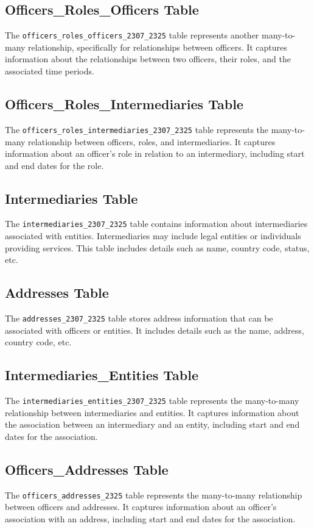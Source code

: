 \documentclass{article}
\begin{document}
\subsection*{Officers\_Roles\_Officers Table}
The \texttt{officers\_roles\_officers\_2307\_2325} table represents another many-to-many relationship, specifically for relationships between officers. It captures information about the relationships between two officers, their roles, and the associated time periods.

\subsection*{Officers\_Roles\_Intermediaries Table}
The \texttt{officers\_roles\_intermediaries\_2307\_2325} table represents the many-to-many relationship between officers, roles, and intermediaries. It captures information about an officer's role in relation to an intermediary, including start and end dates for the role.

\subsection*{Intermediaries Table}
The \texttt{intermediaries\_2307\_2325} table contains information about intermediaries associated with entities. Intermediaries may include legal entities or individuals providing services. This table includes details such as name, country code, status, etc.

\subsection*{Addresses Table}
The \texttt{addresses\_2307\_2325} table stores address information that can be associated with officers or entities. It includes details such as the name, address, country code, etc.

\subsection*{Intermediaries\_Entities Table}
The \texttt{intermediaries\_entities\_2307\_2325} table represents the many-to-many relationship between intermediaries and entities. It captures information about the association between an intermediary and an entity, including start and end dates for the association.

\subsection*{Officers\_Addresses Table}
The \texttt{officers\_addresses\_2325} table represents the many-to-many relationship between officers and addresses. It captures information about an officer's association with an address, including start and end dates for the association.
\end{document}
